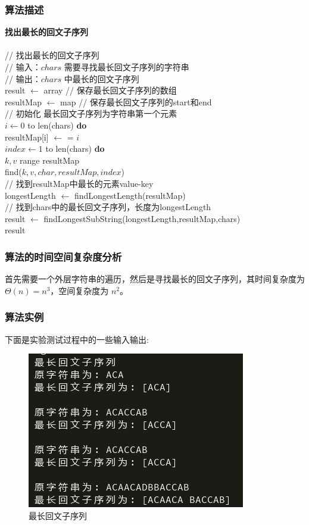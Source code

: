 \documentclass{ctexart}
\newcommand\tab[1][1cm]{\hspace*{#1}}
\begin{document}
\subsubsection{算法描述 }
   {\bfseries 找出最长的回文子序列} \\
	\tab{\bfseries{算法 find$(chars)$ }} \\
	\tab// 找出最长的回文子序列 \\
	\tab// 输入：$chars$ 需要寻找最长回文子序列的字符串\\
	\tab// 输出：$chars$ 中最长的回文子序列\\
	\tab result $\leftarrow$ array // 保存最长回文子序列的数组\\
	\tab resultMap $\leftarrow$ map // 保存最长回文子序列的start和end \\
	\tab // 初始化 最长回文子序列为字符串第一个元素 \\
	\tab{\bfseries for} $i \leftarrow 0$ to len(chars) {\bfseries do} \\
	\tab\tab resultMap[i] $\leftarrow $ = $i$ \\
	\tab{\bfseries for} $index \leftarrow 1$ to len(chars) {\bfseries do} \\
	\tab\tab{\bfseries for} $k,v $ range resultMap \\
	\tab\tab find($k,v,char,resultMap,index$) \\
	\tab// 找到resultMap中最长的元素value-key\\
	\tab longestLength $\leftarrow$ findLongestLength(resultMap) \\
	\tab// 找到chars中的最长回文子序列，长度为longestLength\\
	\tab result $\leftarrow$ findLongestSubString(longestLength,resultMap,chars) \\
	\tab{\bfseries return} result
\subsubsection{算法的时间空间复杂度分析 }
首先需要一个外层字符串的遍历，然后是寻找最长的回文子序列，其时间复杂度为
$\Theta(n) = n^3$，空间复杂度为 $n^2$。
\subsubsection{算法实例}
下面是实验测试过程中的一些输入输出:
\begin{figure}[H]
	\centering
	\includegraphics[scale=0.6]{../images/max_huiwen.png}
	\caption{最长回文子序列}
\end{figure}
\end{document}
